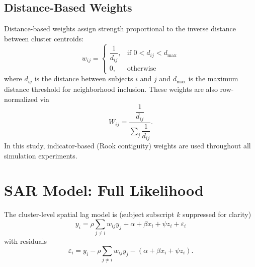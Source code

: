 \documentclass{article}[11pt]
\begin{document}
\subsection*{Distance-Based Weights}

Distance-based weights assign strength proportional to the inverse distance between cluster centroids:
\begin{equation}
    w_{ij} =
    \begin{cases}
        \dfrac{1}{d_{ij}}, & \text{if } 0 < d_{ij} < d_{\max}\\[4pt]
        0, & \text{otherwise}
    \end{cases}
\end{equation}
where $d_{ij}$ is the distance between subjects $i$ and $j$ and $d_{\max}$ is the maximum distance threshold for neighborhood inclusion. These weights are also row-normalized via
\begin{equation}
    W_{ij} = \frac{\dfrac{1}{d_{ij}}}{\displaystyle\sum_{j}\dfrac{1}{d_{ij}}}.
\end{equation}
In this study, indicator-based (Rook contiguity) weights are used throughout all simulation experiments.

\section{SAR Model: Full Likelihood}\label{appendix:SARLikelihood}

The cluster-level spatial lag model is (subject subscript $k$ suppressed for clarity)
\begin{equation}
    y_i = \rho \sum_{j \neq i} w_{ij} y_j + \alpha + \beta x_i + \psi z_i + \varepsilon_i
\end{equation}
with residuals
\begin{equation}
    \varepsilon_i = y_i - \rho \sum_{j \neq i} w_{ij} y_j - \left(\alpha + \beta x_i + \psi z_i\right).
\end{equation}
\end{document}
